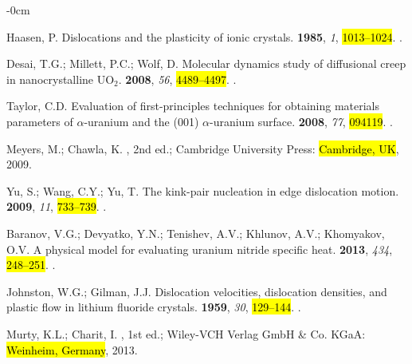 \documentclass[applsci,article,accept,pdftex,moreauthors]{Definitions/mdpi}
\newcommand{\?}{\stackrel{?}{=}}
\begin{document}
\begin{adjustwidth}{-\extralength}{0cm}
\begin{thebibliography}{999}
Haasen, P.
\newblock Dislocations and the plasticity of ionic crystals.
 {\bf 1985}, {\em 1}, \hl{1013--1024}.
.

Desai, T.G.; Millett, P.C.; Wolf, D.
\newblock Molecular dynamics study of diffusional creep in nanocrystalline
  {UO$_2$}.
 {\bf 2008}, {\em 56}, \hl{4489--4497}.
.

Taylor, C.D.
\newblock Evaluation of first-principles techniques for obtaining materials
  parameters of $\alpha$-uranium and the (001) $\alpha$-uranium surface.
 {\bf
  2008}, {\em 77}, \hl{094119}.
.

Meyers, M.; Chawla, K.
, 2nd ed.; Cambridge University Press: \hl{Cambridge, UK}, 2009.

Yu, S.; Wang, C.Y.; Yu, T.
\newblock The kink-pair nucleation in edge dislocation motion.
 {\bf 2009}, {\em 11}, \hl{733--739}.
.

Baranov, V.G.; Devyatko, Y.N.; Tenishev, A.V.; Khlunov, A.V.; Khomyakov, O.V.
\newblock A physical model for evaluating uranium nitride specific heat.
 {\bf 2013}, {\em 434}, \hl{248--251}.
.

Johnston, W.G.; Gilman, J.J.
\newblock Dislocation velocities, dislocation densities, and plastic flow in
  lithium fluoride crystals.
 {\bf 1959}, {\em 30}, \hl{129--144}.
.

Murty, K.L.; Charit, I.
, 1st ed.; Wiley-VCH Verlag
  GmbH \& Co. KGaA: \hl{Weinheim, Germany}, 2013.


\end{thebibliography}
\end{adjustwidth}
\end{document}
